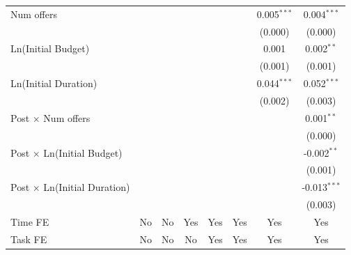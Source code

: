 \documentclass[
]{article}
\begin{document}
\begin{tabular}{lccccccc}
   Num offers                          &                &                &               &               &               & 0.005$^{***}$  & 0.004$^{***}$\\   
                                       &                &                &               &               &               & (0.000)        & (0.000)\\   
   Ln(Initial Budget)                  &                &                &               &               &               & 0.001          & 0.002$^{**}$\\   
                                       &                &                &               &               &               & (0.001)        & (0.001)\\   
   Ln(Initial Duration)                &                &                &               &               &               & 0.044$^{***}$  & 0.052$^{***}$\\   
                                       &                &                &               &               &               & (0.002)        & (0.003)\\   
   Post $\times$ Num offers            &                &                &               &               &               &                & 0.001$^{**}$\\   
                                       &                &                &               &               &               &                & (0.000)\\   
   Post $\times$ Ln(Initial Budget)    &                &                &               &               &               &                & -0.002$^{**}$\\   
                                       &                &                &               &               &               &                & (0.001)\\   
   Post $\times$ Ln(Initial Duration)  &                &                &               &               &               &                & -0.013$^{***}$\\   
                                       &                &                &               &               &               &                & (0.003)\\   
   Time FE                             & No             & No             & Yes           & Yes           & Yes           & Yes            & Yes\\  
   Task FE                             & No             & No             & No            & Yes           & Yes           & Yes            & Yes\\  

\end{tabular}
\end{document}
